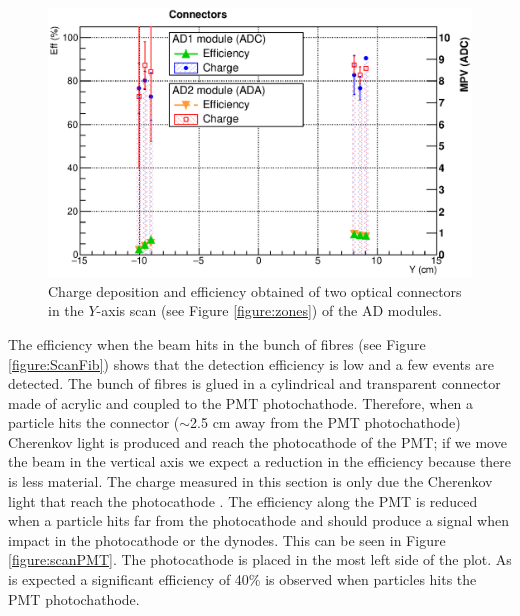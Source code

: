 	\begin{figure}[hb!]
		\begin{center}
			\includegraphics[scale=0.5]{./images/scan/Connectors_scan.eps}
			\caption{
			Charge deposition and efficiency obtained of two optical 
			connectors in the $Y$-axis scan	
			(see Figure \ref{figure:zones}) of the AD modules. 
			}
			\label{figure:ScanConn}
		\end{center}
	\end{figure}
	The efficiency when the beam hits in the bunch of fibres (see Figure \ref{figure:ScanFib}) shows that the detection efficiency is low and a few events are detected. The bunch of fibres is glued in a cylindrical and transparent connector made of acrylic and coupled to the PMT photochathode. Therefore, when a particle hits the connector ($\sim$2.5 cm away from the PMT photochathode) Cherenkov light is produced and reach the photocathode of the PMT; if we move the beam in the vertical axis we expect a reduction in the efficiency because there is less material. The charge measured in this section is only due the Cherenkov light that reach the photocathode \cite{ClearFib-performace}.
	The efficiency along the PMT is reduced when a particle hits far from the photocathode and should produce a 
	signal when impact in the photocathode or the dynodes. This can be seen in Figure \ref{figure:scanPMT}. %
	The photocathode is placed in the most left side of the plot. As is expected a significant efficiency of 40\% 
	is observed when particles hits the PMT photochathode.
	
